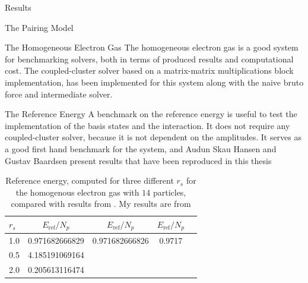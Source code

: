\documentclass[twoside,english]{uiofysmaster}
\begin{document}
\begin{chapter}{Results}
\begin{section}{The Pairing Model}
	\end{section}

	\newpage

	\begin{section}{The Homogeneous Electron Gas}
		The homogeneous electron gas is a good system for benchmarking solvers, both in terms of produced results and computational cost. The coupled-cluster solver based on a matrix-matrix multiplications block implementation, has been implemented for this system along with the naive bruto force and intermediate solver. 

		\begin{subsection}{The Reference Energy}
			A benchmark on the reference energy is useful to test the implementation of the basis states and the interaction. It does not require any coupled-cluster solver, because it is not dependent on the amplitudes. It serves as a good first hand benchmark for the system, and Audun Skau Hansen and Gustav Baardsen \cite{Baardsen,Audun} present results that have been reproduced in this thesis
			\begin{table}[H]
				\begin{center}
					\begin{tabular}[center]{l | c  c  c  r}
						$r_s$ & $E_{\text{ref}} / N_p$ & $E_{\text{ref}} / N_p$ \cite{Baardsen} & $E_{\text{ref}} / N_p$ \cite{Audun} \\
						\hline
						1.0 & 0.971682666829 & 0.971682666826 & 0.9717 \\
						0.5 & 4.185191069164 &  &  \\
						2.0 & 0.205613116474 &  &  
					\end{tabular}
				\end{center}
				\caption{Reference energy, computed for three different $r_s$ for the homogenous electron gas with $14$ particles, compared with results from \cite{Baardsen,Audun}. My results are from \cite{WholmenGithub}}
				\label{table:ReferenceEnergyHEG}
			\end{table}

		\end{subsection}


\end{section}
\end{chapter}
\end{document}
